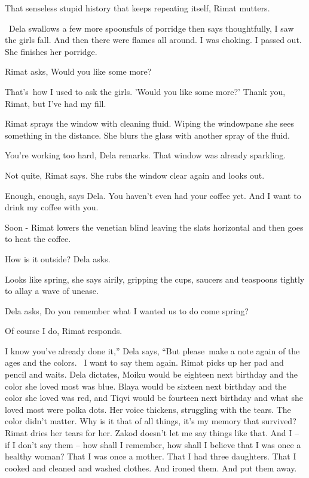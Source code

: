 \documentclass[letterpaper]{article}
\begin{document}
{\textquotedbl}That senseless stupid history that keeps repeating itself,{\textquotedbl} Rimat mutters.

~Dela swallows a few more spoonsfuls of porridge then says thoughtfully, {\textquotedbl}I saw the girls fall. And then
there were flames all around. I was choking. I passed out.{\textquotedbl} She finishes her porridge. 

Rimat asks, {\textquotedbl}Would you like some more?{\textquotedbl} 

{\textquotedbl}That's~how I used to ask the girls. 'Would you like some more?' Thank you, Rimat, but I've had my
fill.{\textquotedbl} 

Rimat sprays the window with cleaning fluid. Wiping the windowpane she sees something\textcolor{red}{ }in the distance.
She blurs the glass with another spray of the fluid. 

{\textquotedbl}You're working too hard,{\textquotedbl} Dela remarks. {\textquotedbl}That window was already
sparkling.{\textquotedbl} 

{\textquotedbl}Not quite,{\textquotedbl} Rimat says. She rubs the window clear again and looks out. 

{\textquotedbl}Enough, enough,{\textquotedbl} says Dela. {\textquotedbl}You haven't even had your coffee yet.
And\textcolor{red}{ }I want to drink my coffee with you.{\textquotedbl} 

{\textquotedbl}Soon -{\textquotedbl} Rimat lowers the venetian blind leaving the slats horizontal and then goes to heat
the coffee.

{\textquotedbl}How is it outside?{\textquotedbl} Dela asks. 

{\textquotedbl}Looks like spring,{\textquotedbl} she says airily, gripping the cups, saucers and teaspoons tightly to
allay a wave of unease.

Dela asks, {\textquotedbl}Do you remember what I wanted us to do come spring?{\textquotedbl}

{\textquotedbl}Of course I do,{\textquotedbl} Rimat responds. 

{\textquotedbl}I know you've already done it,'' Dela says, ``But please~make a note again of the ages and the colors. ~I
want to say them again.{\textquotedbl} Rimat picks up her pad and pencil and waits. Dela dictates, {\textquotedbl}Moiku
would be eighteen next birthday and the color she loved most was blue. Blaya would be sixteen next birthday and the
color she loved was red, and Tiqvi would be fourteen next birthday and what she loved most were polka
dots.{\textquotedbl} Her voice thickens, struggling with the tears. {\textquotedbl}The color didn't matter. Why is it
that of all things, it's my memory that survived?{\textquotedbl} Rimat dries her tears for her. {\textquotedbl}Zakod
doesn't let me say things like that. And I -- if I don't say them -- how shall I remember, how shall I believe that I
was once a healthy woman? That I was once a mother. That I had three daughters. That I cooked and cleaned and washed
clothes. And ironed them. And put them away.{\textquotedbl} 
\end{document}
